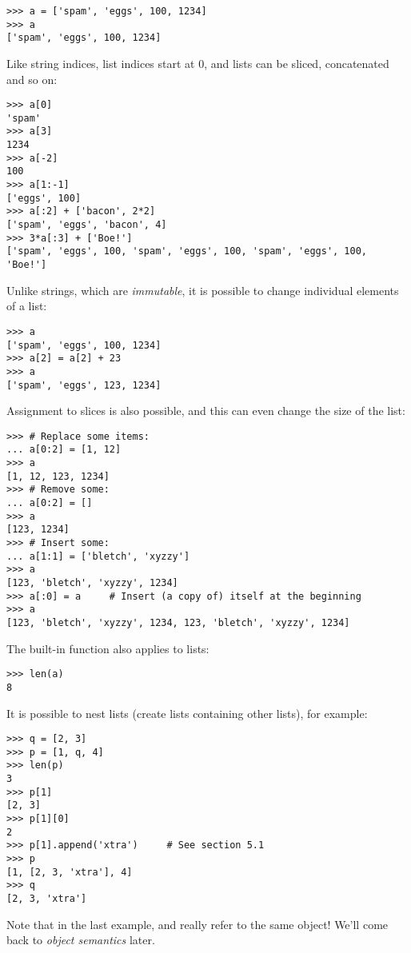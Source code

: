 \documentclass{manual}
\begin{document}
\begin{verbatim}
>>> a = ['spam', 'eggs', 100, 1234]
>>> a
['spam', 'eggs', 100, 1234]
\end{verbatim}

Like string indices, list indices start at 0, and lists can be sliced,
concatenated and so on:

\begin{verbatim}
>>> a[0]
'spam'
>>> a[3]
1234
>>> a[-2]
100
>>> a[1:-1]
['eggs', 100]
>>> a[:2] + ['bacon', 2*2]
['spam', 'eggs', 'bacon', 4]
>>> 3*a[:3] + ['Boe!']
['spam', 'eggs', 100, 'spam', 'eggs', 100, 'spam', 'eggs', 100, 'Boe!']
\end{verbatim}

Unlike strings, which are \emph{immutable}, it is possible to change
individual elements of a list:

\begin{verbatim}
>>> a
['spam', 'eggs', 100, 1234]
>>> a[2] = a[2] + 23
>>> a
['spam', 'eggs', 123, 1234]
\end{verbatim}

Assignment to slices is also possible, and this can even change the size
of the list:

\begin{verbatim}
>>> # Replace some items:
... a[0:2] = [1, 12]
>>> a
[1, 12, 123, 1234]
>>> # Remove some:
... a[0:2] = []
>>> a
[123, 1234]
>>> # Insert some:
... a[1:1] = ['bletch', 'xyzzy']
>>> a
[123, 'bletch', 'xyzzy', 1234]
>>> a[:0] = a     # Insert (a copy of) itself at the beginning
>>> a
[123, 'bletch', 'xyzzy', 1234, 123, 'bletch', 'xyzzy', 1234]
\end{verbatim}

The built-in function  also applies to lists:

\begin{verbatim}
>>> len(a)
8
\end{verbatim}

It is possible to nest lists (create lists containing other lists),
for example:

\begin{verbatim}
>>> q = [2, 3]
>>> p = [1, q, 4]
>>> len(p)
3
>>> p[1]
[2, 3]
>>> p[1][0]
2
>>> p[1].append('xtra')     # See section 5.1
>>> p
[1, [2, 3, 'xtra'], 4]
>>> q
[2, 3, 'xtra']
\end{verbatim}

Note that in the last example,  and  really refer to
the same object!  We'll come back to \emph{object semantics} later.
\end{document}
